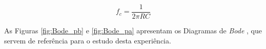 \begin{equation} \label{eq:frequenciacorte}
	f_{c} = \frac{1}{2\pi RC}
\end{equation}

As Figuras \ref{fig:Bode_pb} e \ref{fig:Bode_pa} apresentam os Diagramas de \textit{Bode} , que servem de referência para o estudo desta experiência. 

